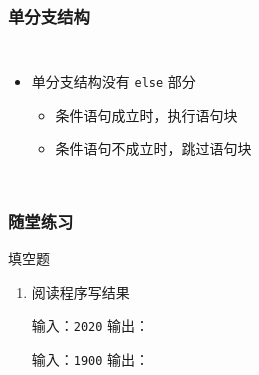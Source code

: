 \begin{frame}[fragile]
    \frametitle{单分支结构}

    \begin{columns}
        \begin{itemize}[<+->]
            \item 单分支结构没有 \lstinline|else| 部分

                \begin{itemize}
                    \item 条件语句成立时，执行语句块
                    \item 条件语句不成立时，跳过语句块
                \end{itemize}

        \end{itemize}

        
    \end{columns}
\end{frame}

\begin{frame}[fragile]
    \frametitle{随堂练习}

    \begin{exampleblock}{填空题}

        \begin{enumerate}
            \item 阅读程序写结果
                

                \vspace{.8ex}
                \small{输入：}\lstinline|2020| \tabto{8em} \small{输出：}

                \small{输入：}\lstinline|1900| \tabto{8em} \small{输出：}
        \end{enumerate}

    \end{exampleblock}
\end{frame}

